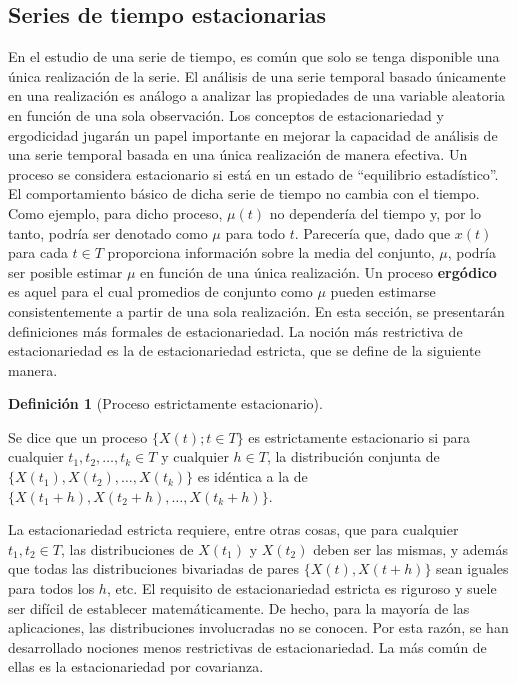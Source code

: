 \documentclass[
  us-letterpaper,
]{scrreprt}
\theoremstyle{definition}
\theoremstyle{plain}
\theoremstyle{plain}
\theoremstyle{definition}
\newtheorem{definition}{Definición}[chapter]
\theoremstyle{remark}
\begin{document}
\subsection{Series de tiempo
estacionarias}\label{series-de-tiempo-estacionarias}

En el estudio de una serie de tiempo, es común que solo se tenga
disponible una única realización de la serie. El análisis de una serie
temporal basado únicamente en una realización es análogo a analizar las
propiedades de una variable aleatoria en función de una sola
observación. Los conceptos de estacionariedad y ergodicidad jugarán un
papel importante en mejorar la capacidad de análisis de una serie
temporal basada en una única realización de manera efectiva. Un proceso
se considera estacionario si está en un estado de ``equilibrio
estadístico''. El comportamiento básico de dicha serie de tiempo no
cambia con el tiempo. Como ejemplo, para dicho proceso, \(\mu(t)\) no
dependería del tiempo y, por lo tanto, podría ser denotado como \(\mu\)
para todo \(t\). Parecería que, dado que \(x(t)\) para cada \(t\in T\)
proporciona información sobre la media del conjunto, \(\mu\), podría ser
posible estimar \(\mu\) en función de una única realización. Un proceso
\textbf{ergódico} es aquel para el cual promedios de conjunto como
\(\mu\) pueden estimarse consistentemente a partir de una sola
realización. En esta sección, se presentarán definiciones más formales
de estacionariedad. La noción más restrictiva de estacionariedad es la
de estacionariedad estricta, que se define de la siguiente manera.

\begin{definition}[Proceso estrictamente
estacionario]\protect\hypertarget{def-PPE}{}\label{def-PPE}

Se dice que un proceso \(\{X(t); t \in T\}\) es estrictamente
estacionario si para cualquier \(t_1, t_2,\ldots, t_k \in T\) y
cualquier \(h \in T\), la distribución conjunta de
\(\{X(t_1), X(t_2),\ldots , X(t_k)\}\) es idéntica a la de
\(\{X(t_1 + h), X(t_2 + h),\ldots, X(t_k + h)\}\).

\end{definition}

La estacionariedad estricta requiere, entre otras cosas, que para
cualquier \(t_1, t_2 \in T\), las distribuciones de \(X(t_1)\) y
\(X(t_2)\) deben ser las mismas, y además que todas las distribuciones
bivariadas de pares \(\{X(t), X(t + h)\}\) sean iguales para todos los
\(h\), etc. El requisito de estacionariedad estricta es riguroso y suele
ser difícil de establecer matemáticamente. De hecho, para la mayoría de
las aplicaciones, las distribuciones involucradas no se conocen. Por
esta razón, se han desarrollado nociones menos restrictivas de
estacionariedad. La más común de ellas es la estacionariedad por
covarianza.
\end{document}

